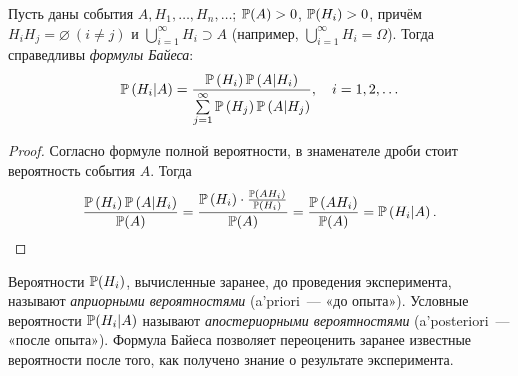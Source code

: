 \begin{namedthm}
	Пусть даны события $A, H_1, \ldots, H_n, \ldots$; ${\operatorname{\mathbb{P}}(A) > 0}$, ${\operatorname{\mathbb{P}}(H_i) > 0}$, причём $H_i H_j = \varnothing ~(i \neq j)$ и $\bigcup\limits_{i=1}^\infty H_i \supset A$ (например, $\bigcup\limits_{i=1}^{\infty}H_i = \Omega$). Тогда справедливы \textit{формулы Байеса}:
	\begin{equation*}
        \operatorname{\mathbb{P}}\left(H_{i} | A\right)= \frac{\operatorname{\mathbb{P}}\left(H_{i}\right) \operatorname{\mathbb{P}}\left(A | H_{i}\right)}{\sum\limits_{j=1}^{\infty} \operatorname{\mathbb{P}}\left(H_{j}\right) \operatorname{\mathbb{P}}\left(A | H_{j}\right)}, \quad i = 1, 2, \ldots
	\end{equation*}
\end{namedthm}
\begin{proof}
	Согласно формуле полной вероятности, в знаменателе дроби стоит вероятность события $A$.
	Тогда
	\begin{equation*}
        \frac{\operatorname{\mathbb{P}}\left(H_{i}\right) \operatorname{\mathbb{P}}\left(A | H_{i}\right)}{\operatorname{\mathbb{P}}(A)}=\frac{\operatorname{\mathbb{P}}\left(H_{i}\right) \cdot \frac{\operatorname{\mathbb{P}}\left(A H_{i}\right)}{\operatorname{\mathbb{P}}\left(H_{i}\right)}}{\operatorname{\mathbb{P}}(A)}=\frac{\operatorname{\mathbb{P}}\left(A H_{i}\right)}{\operatorname{\mathbb{P}}(A)}=\operatorname{\mathbb{P}}\left(H_{i} | A\right). \qedhere
	\end{equation*}
\end{proof}

Вероятности $\operatorname{\mathbb{P}}(H_i)$, вычисленные заранее, до проведения эксперимента, называют \textit{априорными вероятностями} (a’priori~--- «до опыта»). 
Условные вероятности $\operatorname{\mathbb{P}}(H_i | A)$ называют \textit{апостериорными вероятностями} (a’posteriori~--- «после опыта»). 
Формула Байеса позволяет переоценить заранее известные вероятности после того, как получено знание о результате эксперимента.

